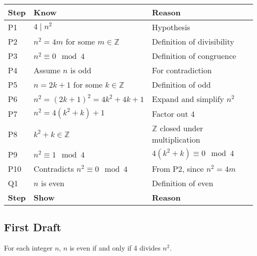 \begin{center}
    \begin{tabular}{|p{}|p{}|p{}|}
    \hline
    \textbf{Step} & \textbf{Know} & \textbf{Reason} \\
    \hline
        P1 & \( 4 \mid n^2 \) & Hypothesis \\
    \hline
        P2 & \( n^2 = 4m \) for some \( m \in \mathbb{Z} \) & Definition of divisibility \\
    \hline
        P3 & \( n^2 \equiv 0 \mod 4 \) & Definition of congruence \\
    \hline
        P4 & Assume \( n \) is odd & For contradiction \\
    \hline
        P5 & \( n = 2k + 1 \) for some \( k \in \mathbb{Z} \) & Definition of odd \\
    \hline
        P6 & \( n^2 = (2k + 1)^2 = 4k^2 + 4k + 1 \) & Expand and simplify \( n^2 \) \\
    \hline
        P7 & \( n^2 = 4(k^2 + k) + 1 \) & Factor out 4 \\
    \hline
        P8 & \( k^2 + k \in \mathbb{Z} \) & \( \mathbb{Z}\) closed under multiplication \\
    \hline
        P9 & \( n^2 \equiv 1 \mod 4 \) & \( 4(k^2 + k) \equiv 0 \mod 4 \) \\
    \hline
        P10 & Contradicts \( n^2 \equiv 0 \mod 4 \) & From P2, since \( n^2 = 4m \) \\
    \hline
        Q1 & \( n \) is even & Definition of even \\
    \hline
    \textbf{Step} & \textbf{Show} & \textbf{Reason} \\
    \hline
    \end{tabular}
\end{center}

\newpage


\subsection{First Draft}


\begin{theorem}
    For each integer \( n \), \( n \) is even if and only if 4 divides \( n^2 \).
\end{theorem}


